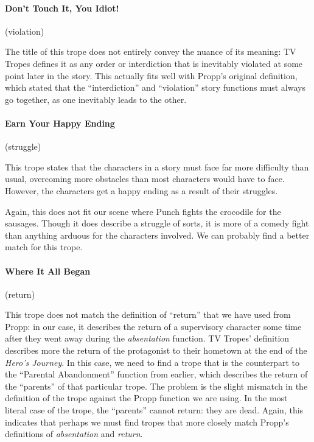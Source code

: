 \documentclass[11pt]{report}
\begin{document}
\paragraph{Don't Touch It, You Idiot!} (violation)

The title of this trope does not entirely convey the nuance of its meaning: TV
Tropes defines it as any order or interdiction that is inevitably violated at
some point later in the story. This actually fits well with Propp's original
definition, which stated that the ``interdiction'' and ``violation'' story
functions must always go together, as one inevitably leads to the other.

\paragraph{Earn Your Happy Ending} (struggle)

This trope states that the characters in a story must face far more difficulty
than usual, overcoming more obstacles than most characters would have to face.
However, the characters get a happy ending as a result of their struggles.

Again, this does not fit our scene where Punch fights the crocodile for the
sausages. Though it does describe a struggle of sorts, it is more of a comedy
fight than anything arduous for the characters involved. We can probably find a
better match for this trope.

\paragraph{Where It All Began} (return)

This trope does not match the definition of ``return'' that we have used from
Propp: in our case, it describes the return of a supervisory character some time
after they went away during the \emph{absentation} function. TV Tropes'
definition describes more the return of the protagonist to their hometown at the
end of the \emph{Hero's Journey}. In this case, we need to find a trope that
is the counterpart to the ``Parental Abandonment'' function from earlier, which
describes the return of the ``parents'' of that particular trope. The problem is
the slight mismatch in the definition of the trope against the Propp function we
are using. In the most literal case of the trope, the ``parents'' cannot return:
they are dead. Again, this indicates that perhaps we must find tropes
that more closely match Propp's definitions of \emph{absentation} and \emph{return}.
\end{document}
